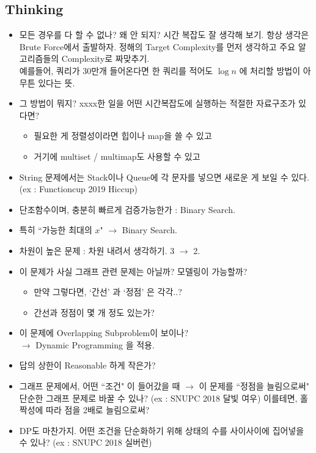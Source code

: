 \documentclass[landscape,8pt]{article}
\begin{document}
\begin{multicols}{2}
  \subsection{Thinking}
    \begin{itemize}
      \item 모든 경우를 다 할 수 없나? 왜 안 되지? 시간 복잡도 잘 생각해 보기. 항상 생각은 Brute Force에서 출발하자. 정해의 Target Complexity를 먼저 생각하고 주요 알고리즘들의 Complexity로 짜맞추기.\\
      예를들어, 쿼리가 30만개 들어온다면 한 쿼리를 적어도 $\log{n}$ 에 처리할 방법이 아무튼 있다는 뜻.
      \item 그 방법이 뭐지? xxxx한 일을 어떤 시간복잡도에 실행하는 적절한 자료구조가 있다면?
      \begin{itemize}
        \item 필요한 게 정렬성이라면 힙이나 map을 쓸 수 있고
        \item 거기에 multiset / multimap도 사용할 수 있고
      \end{itemize}
      \item String 문제에서는 Stack이나 Queue에 각 문자를 넣으면 새로운 게 보일 수 있다. (ex : Functioncup 2019 Hiccup)
      \item 단조함수이며, 충분히 빠르게 검증가능한가 : Binary Search.
      \item 특히 ``가능한 최대의 $x$" $\to$ Binary Search.
      \item 차원이 높은 문제 : 차원 내려서 생각하기. 3 $\rightarrow$ 2.
      \item 이 문제가 사실 그래프 관련 문제는 아닐까? 모델링이 가능할까?
          \begin{itemize}
            \item 만약 그렇다면, `간선' 과 `정점' 은 각각..?
            \item 간선과 정점이 몇 개 정도 있는가?
          \end{itemize}
      \item 이 문제에 Overlapping Subproblem이 보이나? \\$\rightarrow$ Dynamic Programming 을 적용.
      \item 답의 상한이 Reasonable 하게 작은가?
      \item 그래프 문제에서, 어떤 ``조건" 이 들어갔을 때 $\to$ 이 문제를 ``정점을 늘림으로써" 단순한 그래프 문제로 바꿀 수 있나? (ex : SNUPC 2018 달빛 여우) 이를테면, 홀짝성에 따라 점을 2배로 늘림으로써?
      \item DP도 마찬가지. 어떤 조건을 단순화하기 위해 상태의 수를 사이사이에 집어넣을 수 있나? (ex : SNUPC 2018 실버런)

\end{itemize}
\end{multicols}
\end{document}
